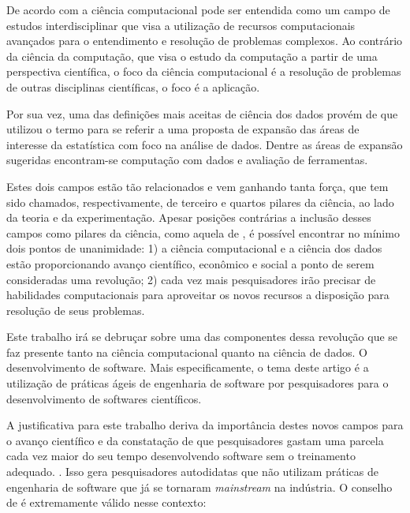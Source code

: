 \documentclass[
	article,			%
	11pt,				%
	oneside,			%
	a4paper,			%
	english,			%
	brazil,				%
	sumario=tradicional
	]{abntex2}
\begin{document}
De acordo com  a ciência computacional pode ser entendida como um campo de estudos interdisciplinar que visa a utilização de recursos computacionais avançados para o entendimento e resolução de problemas complexos. Ao contrário da ciência da computação, que visa o estudo da computação a partir de uma perspectiva científica, o foco da ciência computacional é a resolução de problemas de outras disciplinas científicas, o foco é a aplicação.

Por sua vez, uma das definições mais aceitas de ciência dos dados provém de  que utilizou o termo para se referir a uma proposta de expansão das áreas de interesse da estatística com foco na análise de dados. Dentre as áreas de expansão sugeridas encontram-se computação com dados e avaliação de ferramentas.


Estes dois campos estão tão relacionados e vem ganhando tanta força, que tem sido chamados, respectivamente, de terceiro e quartos pilares da ciência, ao lado da teoria e da experimentação. Apesar posições contrárias a inclusão desses campos como pilares da ciência, como aquela de , é possível encontrar no mínimo dois pontos de unanimidade: 1) a ciência computacional e a ciência dos dados estão proporcionando avanço científico, econômico e social a ponto de serem consideradas uma revolução; 2) cada vez mais pesquisadores irão precisar de habilidades computacionais para aproveitar os novos recursos a disposição para resolução de seus problemas.


Este trabalho irá se debruçar sobre uma das componentes dessa revolução que se faz presente tanto na ciência computacional quanto na ciência de dados. O desenvolvimento de software. Mais especificamente, o tema deste artigo é a utilização de práticas ágeis de engenharia de software por pesquisadores para o desenvolvimento de softwares científicos.

A justificativa para este trabalho deriva da importância destes novos campos para o avanço científico e da constatação de que pesquisadores gastam uma parcela cada vez maior do seu tempo desenvolvendo software sem o treinamento adequado. \cite{wilson2014}. Isso gera pesquisadores autodidatas que não utilizam práticas de engenharia de software que já se tornaram \emph{mainstream} na indústria. O conselho de  é extremamente válido nesse contexto:  
\end{document}
